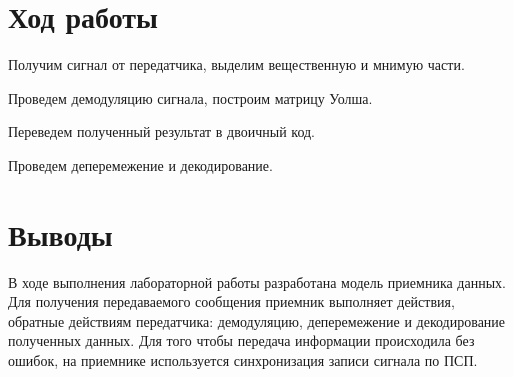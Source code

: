 \documentclass[a4paper]{article}
\begin{document}
\section{Ход работы}
Получим сигнал от передатчика, выделим вещественную и мнимую части.


Проведем демодуляцию сигнала, построим матрицу Уолша.


Переведем полученный результат в двоичный код. 


Проведем деперемежение и декодирование.


\section{Выводы}
В ходе выполнения лабораторной работы разработана модель приемника данных. Для получения передаваемого сообщения приемник выполняет действия, обратные действиям передатчика: демодуляцию, деперемежение и декодирование полученных данных. Для того чтобы передача информации происходила без ошибок, на приемнике используется синхронизация записи сигнала по ПСП.
\end{document}

